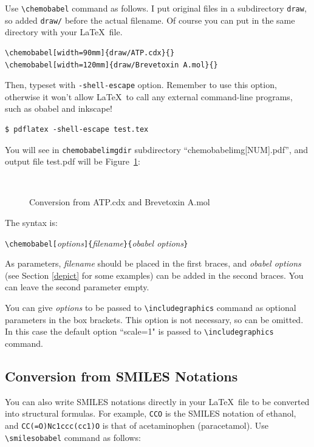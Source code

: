 \documentclass[12pt]{ltjsarticle}
\begin{document}
Use \verb|\chemobabel| command as follows. I put original files in a
subdirectory \texttt{draw}, so added \texttt{draw/} before the actual filename.
Of course you can put in the same directory with your \LaTeX\ file.

\begin{verbatim}
\chemobabel[width=90mm]{draw/ATP.cdx}{}
\chemobabel[width=120mm]{draw/Brevetoxin A.mol}{}
\end{verbatim}

Then, typeset with \verb|-shell-escape| option.
Remember to use this option, otherwise it won't allow \LaTeX\ to
call any external command-line programs, such as obabel and inkscape!
\begin{verbatim}
$ pdflatex -shell-escape test.tex
\end{verbatim}
You will see in \verb|chemobabelimgdir| subdirectory ``chemobabelimg[NUM].pdf'',
and output file test.pdf will be Figure~\ref{fig:chem1}:

\begin{figure}[h]
  \centering
   \\ \vspace{1cm}
  \caption{Conversion from ATP.cdx and Brevetoxin A.mol}\label{fig:chem1}
\end{figure}

The syntax is:
\begin{center}
\verb|\chemobabel[|\textit{options}\verb|]{|\textit{filename}\verb|}{|\textit{obabel options}\verb|}|
\end{center}
As parameters, \textit{filename} should be placed in the first braces, and
\textit{obabel options} (see Section \ref{depict} for some examples)
can be added in the second braces.
You can leave the second parameter empty.

You can give \textit{options} to be passed to \verb|\includegraphics|
command as optional parameters in the box brackets.
This option is not necessary, so can be omitted. In this case the default
option ``scale=1" is passed to \verb|\includegraphics| command.

\subsection{Conversion from SMILES Notations}

You can also write SMILES notations directly in your \LaTeX\ file to be
converted into structural formulas.
For example, \verb|CCO| is the SMILES notation of ethanol, and
\verb|CC(=O)Nc1ccc(cc1)O| is that of acetaminophen (paracetamol).
Use \verb|\smilesobabel| command as follows:
\end{document}
